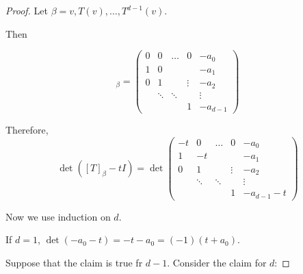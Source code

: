 \documentclass[11pt]{scrartcl}
\begin{document}
\begin{proof}
  Let $\beta = v, T(v), \dots, T^{d-1}(v)$.

  Then

  \begin{equation*}
    [T]_{\beta} = 
    \begin{pmatrix}
      0 & 0      & \dots  & 0      & -a_0   \\
      1 & 0      &        &        & -a_1   \\
      0 & 1      &        & \vdots & -a_2   \\
        & \ddots & \ddots &        & \vdots \\
        &        &        & 1      & -a_{d-1}
      \end{pmatrix}
    \end{equation*}

    Therefore, 
    \begin{equation*}
      \det ([T]_{\beta} -t I) = 
      \det\begin{pmatrix}
        -t & 0      & \dots  & 0      & -a_0   \\
        1  & -t     &        &        & -a_1   \\
        0  & 1      &        & \vdots & -a_2   \\
           & \ddots & \ddots &        & \vdots \\
           &        &        & 1      & -a_{d-1}-t
         \end{pmatrix}
    \end{equation*}

    Now we use induction on $d$.

    If $d=1$, $\det(-a_0-t) = -t-a_0 = (-1)(t+a_0)$.

    Suppose that the claim is true fr $d-1$. Consider the claim for $d$:


\end{proof}
\end{document}
